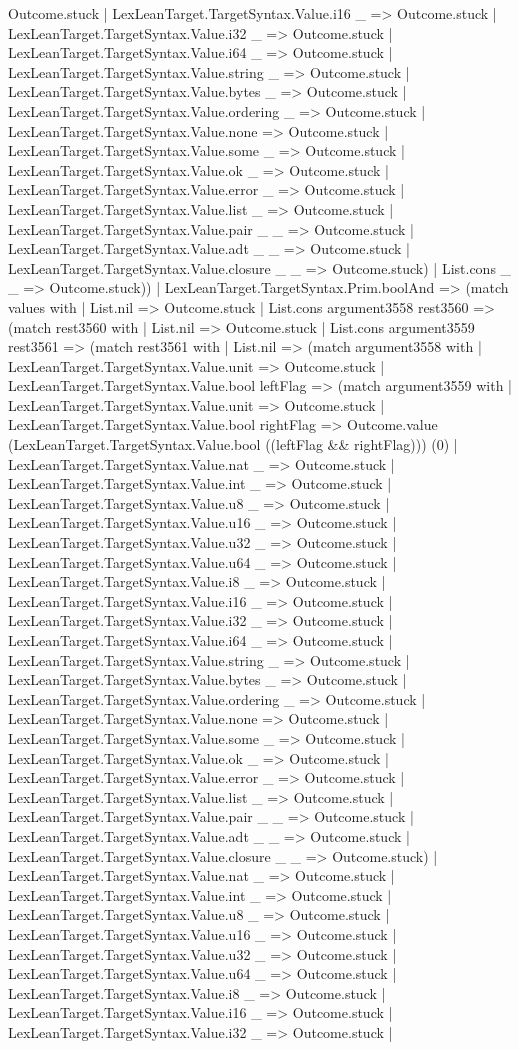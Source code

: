 \documentclass[11pt]{article}
\begin{document}
Outcome.stuck | LexLeanTarget.TargetSyntax.Value.i16 \_ => Outcome.stuck | LexLeanTarget.TargetSyntax.Value.i32 \_ => Outcome.stuck | LexLeanTarget.TargetSyntax.Value.i64 \_ => Outcome.stuck | LexLeanTarget.TargetSyntax.Value.string \_ => Outcome.stuck | LexLeanTarget.TargetSyntax.Value.bytes \_ => Outcome.stuck | LexLeanTarget.TargetSyntax.Value.ordering \_ => Outcome.stuck | LexLeanTarget.TargetSyntax.Value.none => Outcome.stuck | LexLeanTarget.TargetSyntax.Value.some \_ => Outcome.stuck | LexLeanTarget.TargetSyntax.Value.ok \_ => Outcome.stuck | LexLeanTarget.TargetSyntax.Value.error \_ => Outcome.stuck | LexLeanTarget.TargetSyntax.Value.list \_ => Outcome.stuck | LexLeanTarget.TargetSyntax.Value.pair \_ \_ => Outcome.stuck | LexLeanTarget.TargetSyntax.Value.adt \_ \_ => Outcome.stuck | LexLeanTarget.TargetSyntax.Value.closure \_ \_ => Outcome.stuck) | List.cons \_ \_ => Outcome.stuck)) | LexLeanTarget.TargetSyntax.Prim.boolAnd => (match values with | List.nil => Outcome.stuck | List.cons argument3558 rest3560 => (match rest3560 with | List.nil => Outcome.stuck | List.cons argument3559 rest3561 => (match rest3561 with | List.nil => (match argument3558 with | LexLeanTarget.TargetSyntax.Value.unit => Outcome.stuck | LexLeanTarget.TargetSyntax.Value.bool leftFlag => (match argument3559 with | LexLeanTarget.TargetSyntax.Value.unit => Outcome.stuck | LexLeanTarget.TargetSyntax.Value.bool rightFlag => Outcome.value (LexLeanTarget.TargetSyntax.Value.bool ((leftFlag \&\& rightFlag))) (0) | LexLeanTarget.TargetSyntax.Value.nat \_ => Outcome.stuck | LexLeanTarget.TargetSyntax.Value.int \_ => Outcome.stuck | LexLeanTarget.TargetSyntax.Value.u8 \_ => Outcome.stuck | LexLeanTarget.TargetSyntax.Value.u16 \_ => Outcome.stuck | LexLeanTarget.TargetSyntax.Value.u32 \_ => Outcome.stuck | LexLeanTarget.TargetSyntax.Value.u64 \_ => Outcome.stuck | LexLeanTarget.TargetSyntax.Value.i8 \_ => Outcome.stuck | LexLeanTarget.TargetSyntax.Value.i16 \_ => Outcome.stuck | LexLeanTarget.TargetSyntax.Value.i32 \_ => Outcome.stuck | LexLeanTarget.TargetSyntax.Value.i64 \_ => Outcome.stuck | LexLeanTarget.TargetSyntax.Value.string \_ => Outcome.stuck | LexLeanTarget.TargetSyntax.Value.bytes \_ => Outcome.stuck | LexLeanTarget.TargetSyntax.Value.ordering \_ => Outcome.stuck | LexLeanTarget.TargetSyntax.Value.none => Outcome.stuck | LexLeanTarget.TargetSyntax.Value.some \_ => Outcome.stuck | LexLeanTarget.TargetSyntax.Value.ok \_ => Outcome.stuck | LexLeanTarget.TargetSyntax.Value.error \_ => Outcome.stuck | LexLeanTarget.TargetSyntax.Value.list \_ => Outcome.stuck | LexLeanTarget.TargetSyntax.Value.pair \_ \_ => Outcome.stuck | LexLeanTarget.TargetSyntax.Value.adt \_ \_ => Outcome.stuck | LexLeanTarget.TargetSyntax.Value.closure \_ \_ => Outcome.stuck) | LexLeanTarget.TargetSyntax.Value.nat \_ => Outcome.stuck | LexLeanTarget.TargetSyntax.Value.int \_ => Outcome.stuck | LexLeanTarget.TargetSyntax.Value.u8 \_ => Outcome.stuck | LexLeanTarget.TargetSyntax.Value.u16 \_ => Outcome.stuck | LexLeanTarget.TargetSyntax.Value.u32 \_ => Outcome.stuck | LexLeanTarget.TargetSyntax.Value.u64 \_ => Outcome.stuck | LexLeanTarget.TargetSyntax.Value.i8 \_ => Outcome.stuck | LexLeanTarget.TargetSyntax.Value.i16 \_ => Outcome.stuck | LexLeanTarget.TargetSyntax.Value.i32 \_ => Outcome.stuck | 
\end{document}
